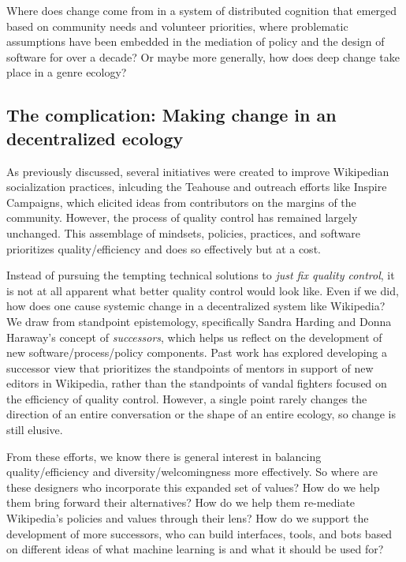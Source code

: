 Where does change come from in a system of distributed cognition that emerged based on community needs and volunteer priorities, where problematic assumptions have been embedded in the mediation of policy and the design of software for over a decade?  Or maybe more generally, how does deep change take place in a genre ecology?

\subsection{The complication: Making change in an decentralized ecology}
As previously discussed, several initiatives were created to improve Wikipedian socialization practices, inlcuding the Teahouse and outreach efforts like Inspire Campaigns\cite{morgan2015what}, which elicited ideas from contributors on the margins of the community. However, the process of quality control has remained largely unchanged.  This assemblage of mindsets, policies, practices, and software prioritizes quality/efficiency and does so effectively \cite{geiger2013levee}\cite{halfaker2014snuggle} but at a cost.

Instead of pursuing the tempting technical solutions to \emph{just fix quality control}, it is not at all apparent what better quality control would look like.  Even if we did, how does one cause systemic change in a decentralized system like Wikipedia?  We draw from standpoint epistemology, specifically Sandra Harding and Donna Haraway's concept of \emph{successors}\cite{haraway1988situated}\cite{harding1987feminism}, which helps us reflect on the development of new software/process/policy components.  Past work has explored developing a successor view that prioritizes the standpoints of mentors in support of new editors in Wikipedia, rather than the standpoints of vandal fighters focused on the efficiency of quality control\cite{halfaker2014snuggle}\cite{geiger2014successor}. However, a single point rarely changes the direction of an entire conversation or the shape of an entire ecology, so change is still elusive.

From these efforts, we know there is general interest in balancing quality/efficiency and diversity/welcomingness more effectively.  So where are these designers who incorporate this expanded set of values?  How do we help them bring forward their alternatives?  How do we help them re-mediate Wikipedia's policies and values through their lens?  How do we support the development of more successors, who can build interfaces, tools, and bots based on different ideas of what machine learning is and what it should be used for?

